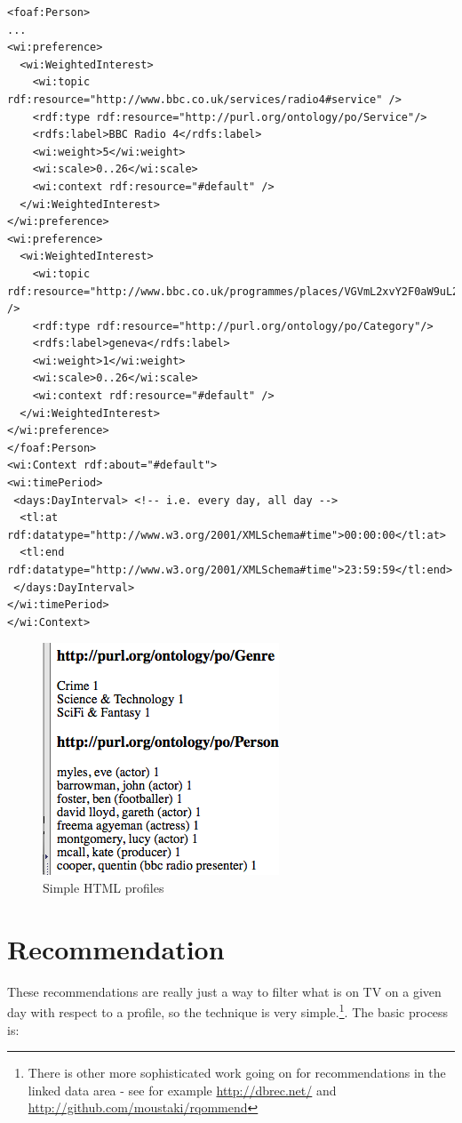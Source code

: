 \documentclass[]{article}
\begin{document}
\begin{verbatim}
<foaf:Person>
...
<wi:preference>
  <wi:WeightedInterest>
    <wi:topic rdf:resource="http://www.bbc.co.uk/services/radio4#service" />
    <rdf:type rdf:resource="http://purl.org/ontology/po/Service"/>
    <rdfs:label>BBC Radio 4</rdfs:label>
    <wi:weight>5</wi:weight>
    <wi:scale>0..26</wi:scale>
    <wi:context rdf:resource="#default" />
  </wi:WeightedInterest>
</wi:preference>
<wi:preference>
  <wi:WeightedInterest>
    <wi:topic rdf:resource="http://www.bbc.co.uk/programmes/places/VGVmL2xvY2F0aW9uL2dlbmV2YQ#place" />
    <rdf:type rdf:resource="http://purl.org/ontology/po/Category"/>
    <rdfs:label>geneva</rdfs:label>
    <wi:weight>1</wi:weight>
    <wi:scale>0..26</wi:scale>
    <wi:context rdf:resource="#default" />
  </wi:WeightedInterest>
</wi:preference>
</foaf:Person>
<wi:Context rdf:about="#default">
<wi:timePeriod>
 <days:DayInterval> <!-- i.e. every day, all day -->
  <tl:at rdf:datatype="http://www.w3.org/2001/XMLSchema#time">00:00:00</tl:at>
  <tl:end rdf:datatype="http://www.w3.org/2001/XMLSchema#time">23:59:59</tl:end>
 </days:DayInterval>
</wi:timePeriod>
</wi:Context>
\end{verbatim}

\begin{figure}[h] 
\begin{center}
\includegraphics[width=6 cm]{htmlprofile.png}
\caption{Simple HTML profiles}
\label{htmlprofile}
\end{center}
\end{figure}


\section{Recommendation}

These recommendations are really just a way to filter what is on TV on a given day with respect to a profile, so the technique is very simple.\footnote{There is other more sophisticated work going on for recommendations in the linked data area - see for example \url{http://dbrec.net/} and \url{http://github.com/moustaki/rqommend}}. The basic process is:
\end{document}
